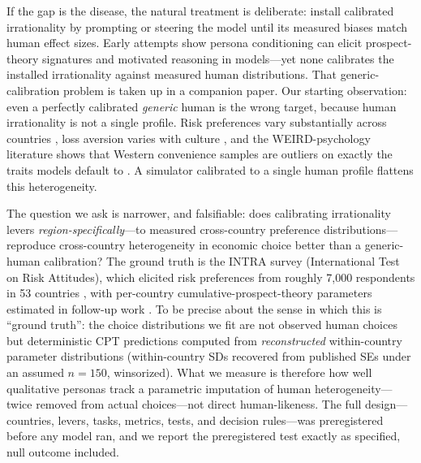 \documentclass[10pt,letterpaper]{article}
\begin{document}
If the gap is the disease, the natural treatment is deliberate: install
calibrated irrationality by prompting or steering the model until its
measured biases match human effect sizes. Early attempts show persona
conditioning can elicit prospect-theory signatures \citep{dubedy2026} and
motivated reasoning in models---yet none calibrates the installed
irrationality against measured human distributions. That generic-calibration
problem is taken up in a companion paper. Our starting observation: even a perfectly calibrated \textit{generic}
human is the wrong target, because human irrationality is not a single
profile. Risk
preferences vary substantially across countries \citep{rieger2015}, loss
aversion varies with culture \citep{wang2017}, and the WEIRD-psychology
literature shows that Western convenience samples are outliers on exactly
the traits models default to \citep{henrich2010}. A simulator calibrated to
a single human profile flattens this heterogeneity.

The question we ask is narrower, and falsifiable: does calibrating
irrationality levers \textit{region-specifically}---to measured cross-country
preference distributions---reproduce cross-country heterogeneity in
economic choice better than a generic-human calibration? The ground truth is
the INTRA survey (International Test on Risk Attitudes), which elicited risk
preferences from roughly 7,000 respondents in 53 countries
\citep{rieger2015}, with per-country cumulative-prospect-theory parameters
estimated in follow-up work \citep{rieger2017}. To be precise about the sense in which
this is ``ground truth'': the choice distributions we fit are not observed
human choices but deterministic CPT predictions computed from
\textit{reconstructed} within-country parameter distributions
(within-country SDs recovered from published SEs under an assumed $n=150$,
winsorized). What we measure is therefore how well qualitative personas
track a parametric imputation of human heterogeneity---twice removed from
actual choices---not direct human-likeness. The full
design---countries, levers, tasks, metrics, tests, and decision
rules---was preregistered before any model ran, and we report the
preregistered test exactly as specified, null outcome included.
\end{document}
